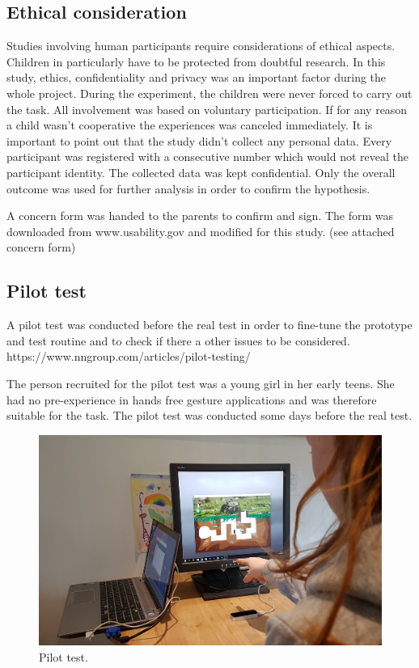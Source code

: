 \subsection{Ethical consideration}
\label{sec:ethical}

Studies involving human participants require considerations of ethical aspects. Children in particularly have to be protected from doubtful research. In this study, ethics, confidentiality and privacy was an important factor during the whole project.
During the experiment, the children were never forced to carry out the task. All involvement was based on voluntary participation. If for any reason a child wasn't cooperative the experiences was canceled immediately. 
It is important to point out that the study didn't collect any personal data. Every participant was registered with a consecutive number which would not reveal the participant identity. The collected data was kept confidential. Only the overall outcome was used for further analysis in order to confirm the hypothesis.  

A concern form was handed to the parents to confirm and sign. The form was downloaded from www.usability.gov and modified for this study. (see attached concern form)


\subsection{Pilot test}

A pilot test was conducted before the real test in order to fine-tune the prototype and test routine and to check if there a other issues to be considered. 
https://www.nngroup.com/articles/pilot-testing/

The person recruited for the pilot test was a young girl in her early teens. She had no pre-experience in hands free gesture applications and was therefore suitable for the task.
The pilot test was conducted some days before the real test.

\begin{figure}[h]  %
  \centering
  \includegraphics[width=.5\textwidth]{figures/pilottest.jpg}
  \caption[Pilot test.]{Pilot test.}
  \label{fig:pilottest}
\end{figure}

